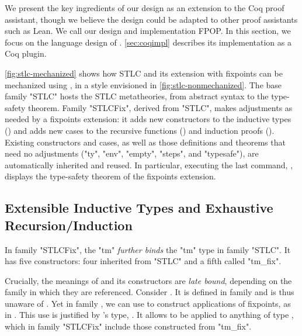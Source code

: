 We present the key ingredients of our design as an extension to the Coq
proof assistant,
though we believe the design could be adapted to other proof assistants such as Lean.
We call our design and implementation \ac{FPOP}.
In this section, we focus on the language design of \Lang.
\cref{sec:coqimpl} describes its implementation as a Coq plugin.



\cref{fig:stlc-mechanized} shows how STLC and its extension with
fixpoints can be mechanized using \Lang, in a style envisioned in
\cref{fig:stlc-nonmechanized}.
The base family "STLC" hosts the STLC metatheories, from abstract syntax
to the type-safety theorem.
Family "STLCFix", derived from "STLC", makes adjustments as needed by a fixpoints extension:
it adds new constructors to the inductive types () and
adds new cases to the recursive functions () and
induction proofs ().
Existing constructors and cases, as well as those definitions and
theorems that need no adjustments ("ty", "env", "empty", "steps", and
"typesafe"), are automatically inherited and reused.
In particular, executing the last command, ,
displays the type-safety theorem of the fixpoints extension.

\subsection{Extensible Inductive Types and Exhaustive Recursion/Induction}


In family "STLCFix", %
the  "tm" \emph{further binds} the "tm" type
in family "STLC". It has five constructors: four inherited from
"STLC" and a fifth called "tm_fix".

Crucially, the meanings of  and its constructors are
\emph{late bound}, depending on the family in which they are referenced.
Consider .
It is defined in family  and is thus unaware of .
Yet in family , we can use  to construct
applications of fixpoints, as in
.
This use is justified by 's type,
.
It allows  to be applied to anything of type ,
which in family "STLCFix" include those constructed from "tm_fix".


